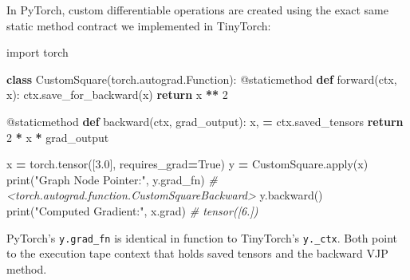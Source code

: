 \documentclass[
  letterpaper,
]{scrbook}
\newenvironment{Shaded}{\begin{snugshade}}{\end{snugshade}}
\newcommand{\AttributeTok}[1]{\textcolor[rgb]{0.13,0.29,0.53}{#1}}
\newcommand{\BuiltInTok}[1]{#1}
\newcommand{\CommentTok}[1]{\textcolor[rgb]{0.56,0.35,0.01}{\textit{#1}}}
\newcommand{\ControlFlowTok}[1]{\textcolor[rgb]{0.13,0.29,0.53}{\textbf{#1}}}
\newcommand{\DecValTok}[1]{\textcolor[rgb]{0.00,0.00,0.81}{#1}}
\newcommand{\FloatTok}[1]{\textcolor[rgb]{0.00,0.00,0.81}{#1}}
\newcommand{\ImportTok}[1]{#1}
\newcommand{\KeywordTok}[1]{\textcolor[rgb]{0.13,0.29,0.53}{\textbf{#1}}}
\newcommand{\NormalTok}[1]{#1}
\newcommand{\OperatorTok}[1]{\textcolor[rgb]{0.81,0.36,0.00}{\textbf{#1}}}
\newcommand{\StringTok}[1]{\textcolor[rgb]{0.31,0.60,0.02}{#1}}
\newcommand{\VariableTok}[1]{\textcolor[rgb]{0.00,0.00,0.00}{#1}}
\begin{document}
\begin{tcolorbox}[enhanced jigsaw, arc=.35mm, bottomrule=.15mm, bottomtitle=1mm, breakable, colback=white, colbacktitle=quarto-callout-note-color!10!white, colframe=quarto-callout-note-color-frame, coltitle=black, left=2mm, leftrule=.75mm, opacityback=0, opacitybacktitle=0.6, rightrule=.15mm, title=\textcolor{quarto-callout-note-color}{\faInfo}\hspace{0.5em}{PyTorch Systems Bridge: \texttt{torch.autograd.Function} and
\texttt{grad\_fn}}, titlerule=0mm, toprule=.15mm, toptitle=1mm]

In PyTorch, custom differentiable operations are created using the exact
same static method contract we implemented in TinyTorch:

\begin{Shaded}
\begin{Highlighting}[]
\ImportTok{import}\NormalTok{ torch}

\KeywordTok{class}\NormalTok{ CustomSquare(torch.autograd.Function):}
    \AttributeTok{@staticmethod}
    \KeywordTok{def}\NormalTok{ forward(ctx, x):}
\NormalTok{        ctx.save\_for\_backward(x)}
        \ControlFlowTok{return}\NormalTok{ x }\OperatorTok{**} \DecValTok{2}

    \AttributeTok{@staticmethod}
    \KeywordTok{def}\NormalTok{ backward(ctx, grad\_output):}
\NormalTok{        x, }\OperatorTok{=}\NormalTok{ ctx.saved\_tensors}
        \ControlFlowTok{return} \DecValTok{2} \OperatorTok{*}\NormalTok{ x }\OperatorTok{*}\NormalTok{ grad\_output}

\NormalTok{x }\OperatorTok{=}\NormalTok{ torch.tensor([}\FloatTok{3.0}\NormalTok{], requires\_grad}\OperatorTok{=}\VariableTok{True}\NormalTok{)}
\NormalTok{y }\OperatorTok{=}\NormalTok{ CustomSquare.}\BuiltInTok{apply}\NormalTok{(x)}
\BuiltInTok{print}\NormalTok{(}\StringTok{"Graph Node Pointer:"}\NormalTok{, y.grad\_fn)  }\CommentTok{\# \textless{}torch.autograd.function.CustomSquareBackward\textgreater{}}
\NormalTok{y.backward()}
\BuiltInTok{print}\NormalTok{(}\StringTok{"Computed Gradient:"}\NormalTok{, x.grad)      }\CommentTok{\# tensor([6.])}
\end{Highlighting}
\end{Shaded}

PyTorch's \texttt{y.grad\_fn} is identical in function to TinyTorch's
\texttt{y.\_ctx}. Both point to the execution tape context that holds
saved tensors and the backward VJP method.\footnotemark{}

\end{tcolorbox}
\end{document}
